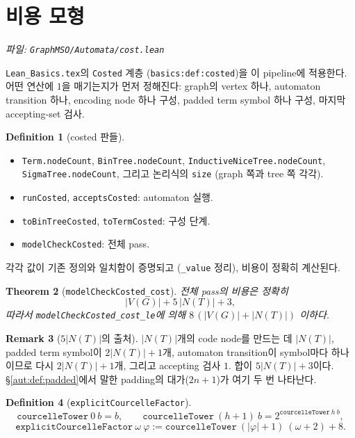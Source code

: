 \documentclass[11pt]{article}
\theoremstyle{definition}
\newtheorem{definition}{Definition}[section]
\newtheorem{remark}[definition]{Remark}
\theoremstyle{plain}
\newtheorem{theorem}[definition]{Theorem}
\newcommand{\lean}[1]{\texttt{#1}}
\newcommand{\leanfile}[1]{\texttt{#1}}
\begin{document}
\section{비용 모형}
\label{aut:sec:cost}

\emph{파일: \leanfile{GraphMSO/Automata/cost.lean}}

\leanfile{Lean\_Basics.tex}의 \lean{Costed} 계층
(\lean{basics:def:costed})을 이 pipeline에 적용한다. 어떤 연산에 $1$을
매기는지가 먼저 정해진다: graph의 vertex 하나, automaton transition 하나,
encoding node 하나 구성, padded term symbol 하나 구성, 마지막 accepting-set
검사.

\begin{definition}[costed 판들]
\label{aut:def:costedversions}
\begin{itemize}
  \item \lean{Term.nodeCount}, \lean{BinTree.nodeCount},
    \lean{InductiveNiceTree.nodeCount}, \lean{SigmaTree.nodeCount},
    그리고 논리식의 \lean{size} (graph 쪽과 tree 쪽 각각).
  \item \lean{runCosted}, \lean{acceptsCosted}: automaton 실행.
  \item \lean{toBinTreeCosted}, \lean{toTermCosted}: 구성 단계.
  \item \lean{modelCheckCosted}: 전체 pass.
\end{itemize}
각각 값이 기존 정의와 일치함이 증명되고 (\lean{\_value} 정리), 비용이 정확히
계산된다.
\end{definition}

\begin{theorem}[\lean{modelCheckCosted\_cost}]
\label{aut:thm:exactcost}
전체 pass의 비용은 정확히
\[
  |V(G)| + 5\,|N(T)| + 3,
\]
따라서 \lean{modelCheckCosted\_cost\_le}에 의해 $8\,(|V(G)| + |N(T)|)$ 이하다.
\end{theorem}

\begin{remark}[$5|N(T)|$의 출처]
$|N(T)|$개의 code node를 만드는 데 $|N(T)|$, padded term symbol이
$2|N(T)|+1$개, automaton transition이 symbol마다 하나이므로 다시
$2|N(T)|+1$개, 그리고 accepting 검사 $1$. 합이 $5|N(T)|+3$이다.
\S\ref{aut:def:padded}에서 말한 padding의 대가($2n+1$)가 여기 두 번
나타난다.
\end{remark}

\begin{definition}[\lean{explicitCourcelleFactor}]
\label{aut:def:tower}
\[
  \lean{courcelleTower}\ 0\ b = b, \qquad
  \lean{courcelleTower}\ (h{+}1)\ b = 2^{\lean{courcelleTower}\ h\ b},
\]
\[
  \lean{explicitCourcelleFactor}\ \omega\ \varphi
    := \lean{courcelleTower}\ (|\varphi|+1)\ (\omega+2) + 8.
\]
\end{definition}
\end{document}
